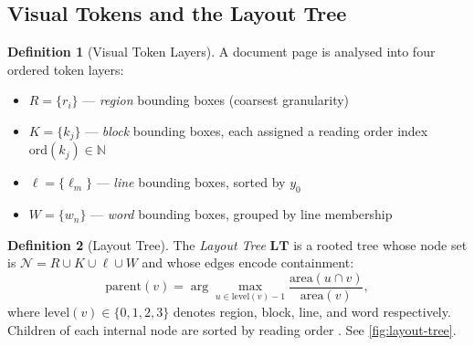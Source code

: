 \documentclass{article}
\theoremstyle{definition}
\newtheorem{definition}{Definition}[section]
\newcommand{\LT}{\mathbf{LT}}
\newcommand{\Nodes}{\mathcal{N}}
\begin{document}
\subsection{Visual Tokens and the Layout Tree}

\begin{definition}[Visual Token Layers]
  A document page is analysed into four ordered token layers:
  \begin{itemize}
    \item $R = \{r_i\}$ --- \emph{region} bounding boxes (coarsest granularity)
    \item $K = \{k_j\}$ --- \emph{block} bounding boxes, each assigned a reading
          order index $\mathrm{ord}(k_j) \in \mathbb{N}$
    \item $\ell = \{\ell_m\}$ --- \emph{line} bounding boxes, sorted by $y_0$
    \item $W = \{w_n\}$ --- \emph{word} bounding boxes, grouped by line membership
  \end{itemize}
\end{definition}

\begin{definition}[Layout Tree]
  \label{def:lt}
  The \emph{Layout Tree} $\LT$ is a rooted tree whose node set is
  $\Nodes = R \cup K \cup \ell \cup W$ and whose edges encode containment:
  \[
    \mathrm{parent}(v) = \arg\max_{u \in \mathrm{level}(v)-1}
    \frac{\mathrm{area}(u \cap v)}{\mathrm{area}(v)},
  \]
  where $\mathrm{level}(v) \in \{0,1,2,3\}$ denotes region, block, line, and
  word respectively.  Children of each internal node are sorted by reading
  order \cite{zhang2024modeling}.  See \cref{fig:layout-tree}.
\end{definition}
\end{document}
